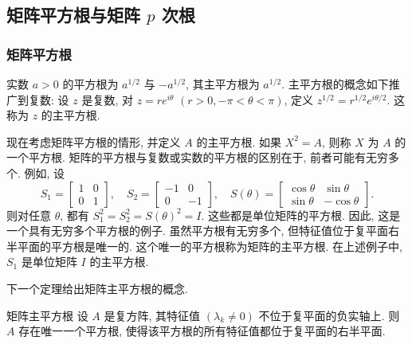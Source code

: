 \subsection{{矩阵平方根与矩阵 $p$ 次根}}\label{sec:matrix-roots}

\subsubsection{{矩阵平方根}}\label{subsec:newton-matrix-square-root}

{实数 $a>0$ 的平方根为 $a^{1/2}$ 与 $-a^{1/2}$, 其主平方根为 $a^{1/2}$. 主平方根的概念如下推广到复数: 设 $z$ 是复数, 对 $z=re^{i\theta}$ $(r>0,-\pi<\theta<\pi)$, 定义 $z^{1/2}=r^{1/2}e^{i\theta/2}$. 这称为 $z$ 的主平方根.}

{现在考虑矩阵平方根的情形, 并定义 $A$ 的主平方根. 如果 $X^2=A$, 则称 $X$ 为 $A$ 的一个平方根. 矩阵的平方根与复数或实数的平方根的区别在于, 前者可能有无穷多个. 例如, 设}
\[S_1=\begin{bmatrix}1&0\\0&1\end{bmatrix},\quad S_2=\begin{bmatrix}-1&0\\0&-1\end{bmatrix},\quad S(\theta)=\begin{bmatrix}\cos\theta&\sin\theta\\\sin\theta&-\cos\theta\end{bmatrix}.\]
{则对任意 $\theta$, 都有 $S_1^2=S_2^2=S(\theta)^2=I$. 这些都是单位矩阵的平方根. 因此, 这是一个具有无穷多个平方根的例子. 虽然平方根有无穷多个, 但特征值位于复平面右半平面的平方根是唯一的. 这个唯一的平方根称为矩阵的主平方根. 在上述例子中, $S_1$ 是单位矩阵 $I$ 的主平方根.}

{下一个定理给出矩阵主平方根的概念.}

\begin{Theorem}{{矩阵主平方根}}\label{thm:principal-matrix-square-root}\label{srcpage:printed-195}
{设 $A$ 是复方阵, 其特征值 $(\lambda_k\ne0)$ 不位于复平面的负实轴上. 则 $A$ 存在唯一一个平方根, 使得该平方根的所有特征值都位于复平面的右半平面.}
\end{Theorem}

